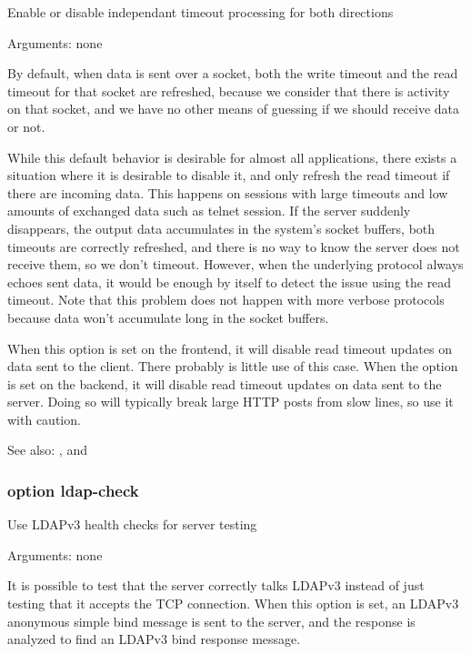 
  Enable or disable independant timeout processing for both directions


  Arguments: none

  By default, when data is sent over a socket, both the write timeout and the
  read timeout for that socket are refreshed, because we consider that there is
  activity on that socket, and we have no other means of guessing if we should
  receive data or not.

  While this default behavior is desirable for almost all applications, there
  exists a situation where it is desirable to disable it, and only refresh the
  read timeout if there are incoming data. This happens on sessions with large
  timeouts and low amounts of exchanged data such as telnet session. If the
  server suddenly disappears, the output data accumulates in the system's
  socket buffers, both timeouts are correctly refreshed, and there is no way
  to know the server does not receive them, so we don't timeout. However, when
  the underlying protocol always echoes sent data, it would be enough by itself
  to detect the issue using the read timeout. Note that this problem does not
  happen with more verbose protocols because data won't accumulate long in the
  socket buffers.

  When this option is set on the frontend, it will disable read timeout updates
  on data sent to the client. There probably is little use of this case. When
  the option is set on the backend, it will disable read timeout updates on
  data sent to the server. Doing so will typically break large HTTP posts from
  slow lines, so use it with caution.

  See also: ,  and 

\subsubsection{option ldap-check}


  Use LDAPv3 health checks for server testing


  Arguments: none

  It is possible to test that the server correctly talks LDAPv3 instead of just
  testing that it accepts the TCP connection. When this option is set, an
  LDAPv3 anonymous simple bind message is sent to the server, and the response
  is analyzed to find an LDAPv3 bind response message.

